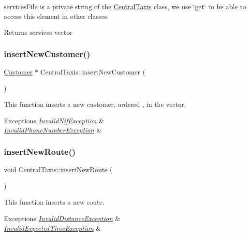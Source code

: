 services\+File is a private string of the \hyperlink{classCentralTaxis}{Central\+Taxis} class, we use \char`\"{}get\char`\"{} to be able to access this element in other classes. \begin{DoxyReturn}{Returns}
services vector 
\end{DoxyReturn}
\hypertarget{classCentralTaxis_aa7d75e8104ae0545d2492a901d0dad01}{}\label{classCentralTaxis_aa7d75e8104ae0545d2492a901d0dad01} 
\subsubsection{\texorpdfstring{insert\+New\+Customer()}{insertNewCustomer()}}
{\footnotesize\ttfamily \hyperlink{classCustomer}{Customer} $\ast$ Central\+Taxis\+::insert\+New\+Customer (\begin{DoxyParamCaption}{ }\end{DoxyParamCaption})}

This function inserts a new customer, ordered , in the vector. 
\begin{DoxyExceptions}{Exceptions}
{\em \hyperlink{classInvalidNifException}{Invalid\+Nif\+Exception}} & \\
\hline
{\em \hyperlink{classInvalidPhoneNumberException}{Invalid\+Phone\+Number\+Exception}} & \\
\hline
\end{DoxyExceptions}
\hypertarget{classCentralTaxis_a6b5ef764a0ea1e6d7db69a132f7f7b93}{}\label{classCentralTaxis_a6b5ef764a0ea1e6d7db69a132f7f7b93} 
\subsubsection{\texorpdfstring{insert\+New\+Route()}{insertNewRoute()}\hspace{0.1cm}{\footnotesize\ttfamily [1/2]}}
{\footnotesize\ttfamily void Central\+Taxis\+::insert\+New\+Route (\begin{DoxyParamCaption}{ }\end{DoxyParamCaption})}

This function inserts a new route. 
\begin{DoxyExceptions}{Exceptions}
{\em \hyperlink{classInvalidDistanceException}{Invalid\+Distance\+Exception}} & \\
\hline
{\em \hyperlink{classInvalidExpectedTimeException}{Invalid\+Expected\+Time\+Exception}} & \\
\hline
\end{DoxyExceptions}
\hypertarget{classCentralTaxis_ac082bb8603c1118dbf262e917d2d1f72}{}\label{classCentralTaxis_ac082bb8603c1118dbf262e917d2d1f72} 
